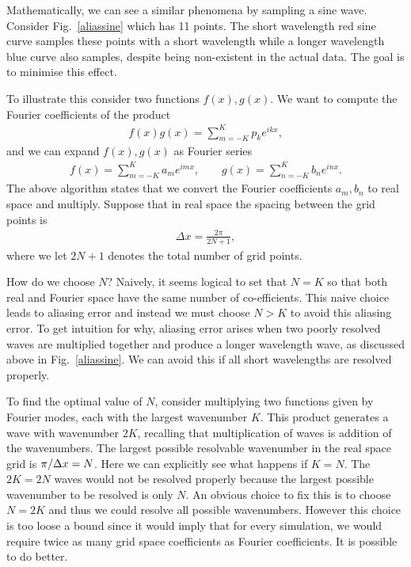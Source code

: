 Mathematically, we can see a similar phenomena by sampling a sine wave. Consider Fig.~\ref{aliassine} which has 11 points. The short wavelength red sine curve samples these points with a short wavelength while a longer wavelength blue curve also samples, despite being non-existent in the actual data. The goal is to minimise this effect. 

To illustrate this consider two functions $f(x),g(x)$. We want to compute the Fourier coefficients of the product
\begin{align}
f(x)g(x) = \sum_{m=-K}^{K} p_{k}e^{ikx},
\end{align}
and we can expand $f(x),g(x)$ as Fourier series
\begin{align}
f(x) = \sum_{m=-K}^{K}a_{m}e^{imx}, \qquad g(x) = \sum_{n=-K}^{K}b_{n}e^{inx}.
\end{align}
The above algorithm states that we convert the Fourier coefficients $a_{m},b_{n}$ to real space and multiply. Suppose that in real space the spacing between the grid points is
\begin{align}
\Delta x = \frac{2\pi }{2N+1},
\end{align}
where we let $2N+1$ denotes the total number of grid points. 

How do we choose $N$? Naively, it seems logical to set that $N=K$ so that both real and Fourier space have the same number of co-efficients. This naive choice leads to aliasing error and instead we must choose $N>K$ to avoid this aliasing error. To get intuition for why, aliasing error arises when two poorly resolved waves are multiplied together and produce a longer wavelength wave, as discussed above in Fig.~\ref{aliassine}. We can avoid this if all short wavelengths are resolved properly.

To find the optimal value of $N$, consider multiplying two functions given by Fourier modes, each with the largest wavenumber $K$. This product generates a wave with wavenumber $2K$, recalling that multiplication of waves is addition of the wavenumbers. The largest possible resolvable wavenumber in the real space grid is $\pi/\Delta x=N$. Here we can explicitly see what happens if $K=N$. The $2K=2N$ waves would not be resolved properly because the largest possible wavenumber to be resolved is only $N$. An obvious choice to fix this is to choose $N=2K$ and thus we could resolve all possible wavenumbers. However this choice is too loose a bound since it would imply that for every simulation, we would require twice as many grid space coefficients as Fourier coefficients. It is possible to do better. 

